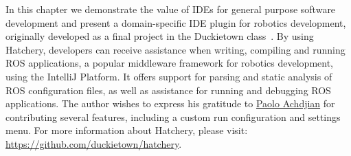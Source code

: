 In this chapter we demonstrate the value of IDEs for general purpose software development and present a domain-specific IDE plugin for robotics development, originally developed as a final project in the Duckietown class~\citep{paull2017duckietown}. By using Hatchery, developers can receive assistance when writing, compiling and running ROS applications, a popular middleware framework for robotics development, using the IntelliJ Platform. It offers support for parsing and static analysis of ROS configuration files, as well as assistance for running and debugging ROS applications. The author wishes to express his gratitude to \href{https://github.com/paoloach}{Paolo Achdjian} for contributing several features, including a custom run configuration and settings menu. For more information about Hatchery, please visit: \url{https://github.com/duckietown/hatchery}.